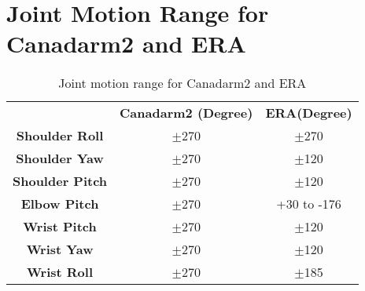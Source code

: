 \section{Joint Motion Range for Canadarm2 and ERA}
\label{app:jointrange}
\begin{table}[H]
\centering
\caption{Joint motion range for Canadarm2 and ERA}
\begin{tabular}{|c|c|c|}
\hline
	&	\textbf{Canadarm2 (Degree)}	&	\textbf{ERA(Degree)}	\\\hhline{|=|=|=|}
\textbf{Shoulder Roll}	&	$\pm$270	&	$\pm$270	\\
\textbf{Shoulder Yaw}	&	$\pm$270	&	$\pm$120	\\
\textbf{Shoulder Pitch}	&	$\pm$270	&	$\pm$120	\\
\textbf{Elbow Pitch}	&	$\pm$270	&	+30 to -176	\\
\textbf{Wrist Pitch}	&	$\pm$270	&	$\pm$120	\\
\textbf{Wrist Yaw}	&	$\pm$270	&	$\pm$120	\\
\textbf{Wrist Roll}	&	$\pm$270	&	$\pm$185	\\\hline
\end{tabular}
\label{tab:jointrange}
\end{table}